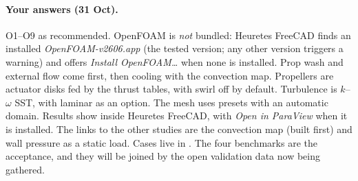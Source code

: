 \paragraph{Your answers (31 Oct).} O1--O9 as recommended. OpenFOAM is \emph{not} bundled: Heuretes FreeCAD finds
an installed \emph{OpenFOAM-v2606.app} (the tested version; any other version triggers a warning) and offers
\emph{Install OpenFOAM\ldots} when none is installed. Prop wash and external flow come first, then cooling with
the convection map. Propellers are actuator disks fed by the thrust tables, with swirl off by default.
Turbulence is $k$--$\omega$ SST, with laminar as an option. The mesh uses  presets with an
automatic domain. Results show inside Heuretes FreeCAD, with \emph{Open in ParaView} when it is installed. The links
to the other studies are the convection map (built first) and wall pressure as a static load. Cases live in
. The four benchmarks are the acceptance, and they will
be joined by the open validation data now being gathered.
